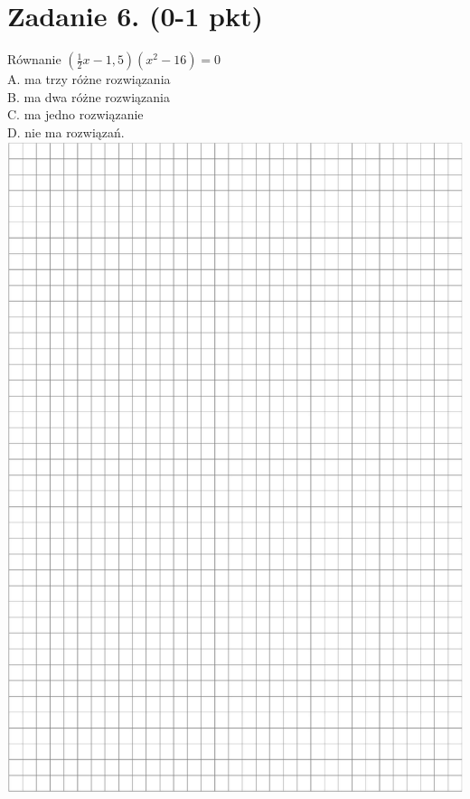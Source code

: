 \documentclass[10pt]{article}
\begin{document}
\section*{Zadanie 6. (0-1 pkt)}
Równanie \(\left(\frac{1}{2} x-1,5\right)\left(x^{2}-16\right)=0\)\\
A. ma trzy różne rozwiązania\\
B. ma dwa różne rozwiązania\\
C. ma jedno rozwiązanie\\
D. nie ma rozwiązań.\\
\includegraphics[max width=\textwidth, center]{2024_11_21_997c30e0b98e62837d84g-03}
\end{document}
